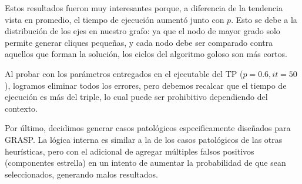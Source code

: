 Estos resultados fueron muy interesantes porque, a diferencia de la tendencia vista en promedio, el tiempo de ejecución aumentó junto con $p$. Esto se debe a la distribución de los ejes en nuestro grafo: ya que el nodo de mayor grado solo permite generar cliques pequeñas, y cada nodo debe ser comparado contra aquellos que forman la solución, los ciclos del algoritmo goloso son más cortos.

Al probar con los parámetros entregados en el ejecutable del TP ($p = 0.6, it = 50$), logramos eliminar todos los errores, pero debemos recalcar que el tiempo de ejecución es más del triple, lo cual puede ser prohibitivo dependiendo del contexto.

Por último, decidimos generar casos patológicos especificamente diseñados para GRASP. La lógica interna es similar a la de los casos patológicos de las otras heurísticas, pero con el adicional de agregar múltiples falsos positivos (componentes estrella) en un intento de aumentar la probabilidad de que sean seleccionados, generando malos resultados.


